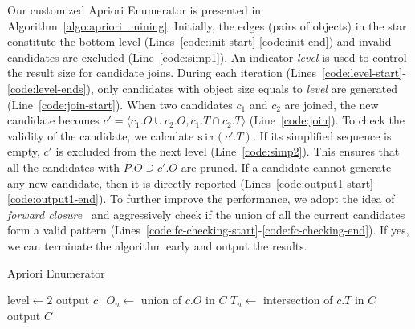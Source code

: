 Our customized Apriori Enumerator is presented in Algorithm~\ref{algo:apriori_mining}. Initially, the edges (pairs of objects) in the star constitute the bottom level (Lines~\ref{code:init-start}-\ref{code:init-end}) and invalid candidates are excluded (Line~\ref{code:simp1}). An indicator \emph{level} is used to control the result size for candidate joins. During each iteration (Lines~\ref{code:level-start}-\ref{code:level-ends}), only candidates with object size equals to \emph{level} are generated (Line~\ref{code:join-start}). When two candidates $c_1$ and $c_2$ are joined, the new candidate becomes $c'=\langle c_1.O \cup c_2.O, c_1.T\cap c_2.T\rangle$ (Line~\ref{code:join}). To check the validity of the candidate, we calculate $\mathtt{sim}(c'.T)$. If its simplified sequence is empty, $c'$ is excluded from the next level (Line~\ref{code:simp2}). This ensures that all the candidates with $P.O\supseteq c'.O$ are pruned. If a candidate cannot generate any new candidate, then
it is directly reported (Lines~\ref{code:output1-start}-\ref{code:output1-end}).
To further improve the performance, we adopt the idea of \textit{forward closure}~\cite{wang2003closet+,pei2000closet} and  aggressively check if the union of all the current candidates form a valid pattern (Lines~\ref{code:fc-checking-start}-\ref{code:fc-checking-end}). If yes, we can  terminate the algorithm early and output the results.

\begin{algorithm}[h]
\caption{Apriori Enumerator}
\label{algo:apriori_mining}
\begin{algorithmic}[1]
 \label{code:init-start}
 \label{code:simp1}
\EndIf 
\EndFor\label{code:init-end}
\State $\mathrm{level} \gets 2$ \label{code:level}
 \label{code:level-start}
		\label{code:join-start}	
			 \label{code:join}			
			 \label{code:simp2}
			\EndIf			
		\EndFor\label{code:join-end}
		 \label{code:output1-start}
				\State output $c_1$
			\EndIf
		\EndIf \label{code:output1-end}
	\EndFor
	\State $O_u \gets $ union of $c.O$ in $C$	\label{code:fc-checking-start}
	\State $T_u \gets $ intersection of $c.T$ in $C$	
		 \label{code:fc-checking}
	\EndIf \label{code:fc-checking-end}
\EndWhile\label{code:level-ends}
\State output $C$ \label{code:output2-end}
\end{algorithmic}
\end{algorithm}



